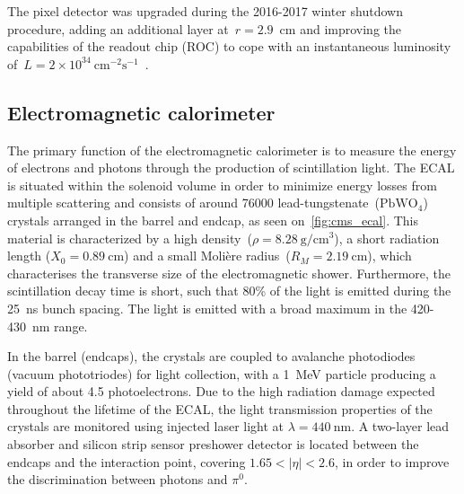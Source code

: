 The pixel detector was upgraded during the 2016-2017 winter shutdown procedure, adding an additional layer at~$r=2.9$~cm and improving the capabilities of the readout chip (ROC) to cope with an instantaneous luminosity of~$L = 2 \times 10^{34}\ \mathrm{cm}^{-2}\mathrm{s}^{-1}$~\cite{Tavolaro:2016hfj}.

\subsection{Electromagnetic calorimeter}
The primary function of the electromagnetic calorimeter is to measure the energy of electrons and photons through the production of scintillation light. The ECAL is situated within the solenoid volume in order to minimize energy losses from multiple scattering and consists of around 76000 lead-tungstenate~($\mathrm{PbWO}_4$) crystals arranged in the barrel and endcap, as seen on~\cref{fig:cms_ecal}. This material is characterized by a high density~($\rho = 8.28~\mathrm{g}/\mathrm{cm}^3$), a short radiation length ($X_0=0.89~\mathrm{cm}$) and a small Moli\`ere radius~($R_M = 2.19~\mathrm{cm}$), which characterises the transverse size of the electromagnetic shower. Furthermore, the scintillation decay time is short, such that 80\% of the light is emitted during the 25~ns bunch spacing. The light is emitted with a broad maximum in the 420-430~nm range.

In the barrel (endcaps), the crystals are coupled to avalanche photodiodes (vacuum phototriodes) for light collection, with a 1~MeV particle producing a yield of about 4.5 photoelectrons. Due to the high radiation damage expected throughout the lifetime of the ECAL, the light transmission properties of the crystals are monitored  using injected laser light at $\lambda = 440~\mathrm{nm}$. A two-layer lead absorber and silicon strip sensor preshower detector is located between the endcaps and the interaction point, covering $1.65 < |\eta| < 2.6$, in order to improve the discrimination between photons and $\pi^0$.

